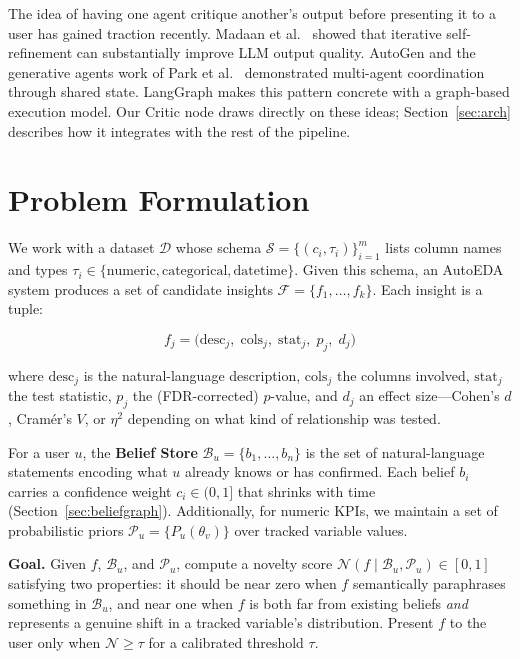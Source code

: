 \documentclass[conference]{IEEEtran}
\begin{document}
The idea of having one agent critique another's output before
presenting it to a user has gained traction recently. Madaan et al.\
\cite{madaan2023self} showed that iterative self-refinement can
substantially improve LLM output quality. AutoGen \cite{autogen2023}
and the generative agents work of Park et al.\ \cite{park2023generative}
demonstrated multi-agent coordination through shared state. LangGraph
\cite{langgraph} makes this pattern concrete with a graph-based
execution model. Our Critic node draws directly on these ideas;
Section~\ref{sec:arch} describes how it integrates with the rest
of the pipeline.

\section{Problem Formulation}
\label{sec:problem}

We work with a dataset $\mathcal{D}$ whose schema
$\mathcal{S} = \{(c_i, \tau_i)\}_{i=1}^{m}$ lists column names and
types $\tau_i \in \{\text{numeric}, \text{categorical}, \text{datetime}\}$.
Given this schema, an AutoEDA system produces a set of candidate
insights $\mathcal{F} = \{f_1, \ldots, f_k\}$. Each insight is a
tuple:

\begin{equation}
  f_j = \bigl(\text{desc}_j,\; \text{cols}_j,\; \text{stat}_j,\; p_j,\; d_j\bigr)
  \label{eq:insight}
\end{equation}

\noindent
where $\text{desc}_j$ is the natural-language description,
$\text{cols}_j$ the columns involved, $\text{stat}_j$ the test
statistic, $p_j$ the (FDR-corrected) $p$-value, and $d_j$ an effect
size---Cohen's $d$, Cramér's $V$, or $\eta^2$ depending on what
kind of relationship was tested.

For a user $u$, the \textbf{Belief Store}
$\mathcal{B}_u = \{b_1, \ldots, b_n\}$ is the set of natural-language
statements encoding what $u$ already knows or has confirmed. Each
belief $b_i$ carries a confidence weight $c_i \in (0,1]$ that shrinks
with time (Section~\ref{sec:beliefgraph}). Additionally, for numeric
KPIs, we maintain a set of probabilistic priors
$\mathcal{P}_u = \{P_u(\theta_v)\}$ over tracked variable values.

\textbf{Goal.} Given $f$, $\mathcal{B}_u$, and $\mathcal{P}_u$, compute
a novelty score $\mathcal{N}(f \mid \mathcal{B}_u, \mathcal{P}_u)
\in [0, 1]$ satisfying two properties: it should be near zero when
$f$ semantically paraphrases something in $\mathcal{B}_u$, and near
one when $f$ is both far from existing beliefs \emph{and} represents
a genuine shift in a tracked variable's distribution. Present $f$
to the user only when $\mathcal{N} \geq \tau$ for a calibrated
threshold $\tau$.
\end{document}
